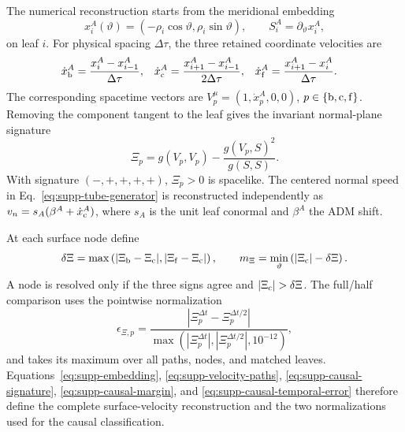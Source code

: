 \documentclass[11pt]{article}
\begin{document}
The numerical reconstruction starts from the meridional embedding
\begin{equation}
x^A_i(\vartheta)=
\left(-\rho_i\cos\vartheta,\rho_i\sin\vartheta\right),
\qquad
S^A_i=\partial_\vartheta x^A_i,
\label{eq:supp-embedding}
\end{equation}
on leaf $i$.  For physical spacing $\Delta\tau$, the three retained coordinate
velocities are
\begin{align}
\dot x^A_{\rm b}&=\frac{x^A_i-x^A_{i-1}}{\Delta\tau},&
\dot x^A_{\rm c}&=\frac{x^A_{i+1}-x^A_{i-1}}{2\Delta\tau},&
\dot x^A_{\rm f}&=\frac{x^A_{i+1}-x^A_i}{\Delta\tau}.
\label{eq:supp-velocity-paths}
\end{align}
The corresponding spacetime vectors are
$V_p^\mu=(1,\dot x^A_p,0,0)$, $p\in\{{\rm b,c,f}\}$.  Removing the component
tangent to the leaf gives the invariant normal-plane signature
\begin{equation}
\Xi_p=g(V_p,V_p)-\frac{g(V_p,S)^2}{g(S,S)}.
\label{eq:supp-causal-signature}
\end{equation}
With signature $(-,+,+,+,+)$, $\Xi_p>0$ is spacelike.  The centered normal
speed in Eq.~\eqref{eq:supp-tube-generator} is reconstructed independently as
$v_n=s_A(\beta^A+\dot x^A_{\rm c})$, where $s_A$ is the unit leaf conormal and
$\beta^A$ the ADM shift.

At each surface node define
\begin{equation}
\delta\Xi=\max\left(
|\Xi_{\rm b}-\Xi_{\rm c}|,
|\Xi_{\rm f}-\Xi_{\rm c}|
\right),
\qquad
m_\Xi=\min_\vartheta\left(|\Xi_{\rm c}|-\delta\Xi\right).
\label{eq:supp-causal-margin}
\end{equation}
A node is resolved only if the three signs agree and
$|\Xi_{\rm c}|>\delta\Xi$.  The full/half comparison uses the pointwise
normalization
\begin{equation}
\epsilon_{\Xi,p}=
\frac{|\Xi^{\Delta t}_p-\Xi^{\Delta t/2}_p|}
{\max(|\Xi^{\Delta t}_p|,|\Xi^{\Delta t/2}_p|,10^{-12})},
\label{eq:supp-causal-temporal-error}
\end{equation}
and takes its maximum over all paths, nodes, and matched leaves.
Equations~\eqref{eq:supp-embedding}, \eqref{eq:supp-velocity-paths},
\eqref{eq:supp-causal-signature}, \eqref{eq:supp-causal-margin}, and
\eqref{eq:supp-causal-temporal-error} therefore define the complete
surface-velocity reconstruction and the two normalizations used for the
causal classification.
\end{document}
